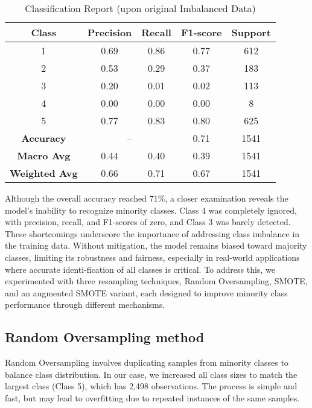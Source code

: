 \begin{table}[!h]
\centering
\caption{Classification Report (upon original Imbalanced Data)}
\label{tab:rf_imbalanced}
\begin{tabular}{|c|c|c|c|c|}
\hline
\textbf{Class} & \textbf{Precision} & \textbf{Recall} & \textbf{F1-score} & \textbf{Support} \\
\hline
1 & 0.69 & 0.86 & 0.77 & 612 \\
2 & 0.53 & 0.29 & 0.37 & 183 \\
3 & 0.20 & 0.01 & 0.02 & 113 \\
4 & 0.00 & 0.00 & 0.00 & 8 \\
5 & 0.77 & 0.83 & 0.80 & 625 \\
\hline
\textbf{Accuracy} & \multicolumn{2}{|c|}{--} & 0.71 & 1541 \\
\hline
\textbf{Macro Avg} & 0.44 & 0.40 & 0.39 &  1541\\
\textbf{Weighted Avg} & 0.66 & 0.71 & 0.67 & 1541 \\
\hline
\end{tabular}
\end{table}

Although the overall accuracy reached 71\%, a closer examination reveals the model's inability to recognize minority classes.
Class 4 was completely ignored, with precision, recall, and F1-scores of zero, and Class 3 was barely detected.
These shortcomings underscore the importance of addressing class imbalance in the training data. Without mitigation,
the model remains biased toward majority classes, limiting its robustness and fairness, especially in real-world applications
where accurate identi-fication of all classes is critical.
To address this, we experimented with three resampling techniques, Random Oversampling, SMOTE, 
and an augmented SMOTE variant, each designed to improve minority class performance through different mechanisms.


\subsection{Random Oversampling method}

Random Oversampling involves duplicating samples from minority classes to balance class distribution.
In our case, we increased all class sizes to match the largest class (Class 5), which has 2,498 observations.
The process is simple and fast, but may lead to overfitting due to repeated instances of the same samples.

